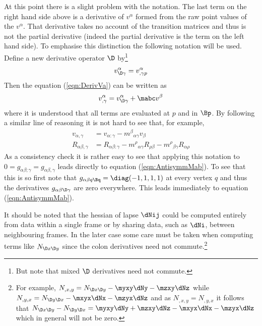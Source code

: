 \documentclass[a4paper,12pt]{article}
\numberwithin{equation}{section}
\begin{document}
At this point there is a slight problem with the notation. The last term on the right hand
side above is a derivative of $v^\alpha$ formed from the raw point values of the $v^\alpha$.
That derivative takes no account of the transition matrices and thus is not the partial
derivative (indeed the partial derivative is the term on the left hand side). To emphasise
this distinction the following notation will be used. Define a new derivative operator $\D$
by\footnote{But note that mixed $\D$ derivatives need not commute.}
\begin{align}
   v^\alpha_{\D\gamma}
   =
   v^\alpha_{,\gamma p}
\end{align}
Then the equation (\ref{eqn:DerivVa}) can be written as
\begin{align}
   v^\alpha_{,\gamma} = v^\alpha_{\D\gamma} + \mabc v^\beta
\end{align}
where it is understood that all terms are evaluated at $p$ and in $\Bp$.
By following a similar line of reasoning it is not hard to see that, for example,
\begin{align}
   v_{\alpha,\gamma} &= v_{\alpha:\gamma} - m^\beta{}_{\alpha\gamma} v_{\beta}\\
   R_{\alpha\beta,\gamma} &= R_{\alpha\beta:\gamma}
                           - m^\rho{}_{\alpha\gamma} R_{\rho\beta}
                           - m^\rho{}_{\beta\gamma} R_{\alpha\rho}
\end{align}
As a consistency check it is rather easy to see that applying this notation to
$0=g_{\alpha\beta;\gamma} = g_{\alpha\beta,\gamma}$ leads directly to equation
(\ref{eqn:AntisymmMab}). To see that this is so first note that $g_{\alpha\beta q\Bq} =
\diag(-1,1,1,1)$ at every vertex $q$ and thus the derivatives $g_{\alpha\beta\D\gamma}$ are
zero everywhere. This leads immediately to equation (\ref{eqn:AntisymmMab}).

It should be noted that the hessian of lapse $\dNij$ could be computed entirely from data
within a single frame or by sharing data, such as $\dNi$, between neighbouring frames. In
the later case some care must be taken when computing terms like $N_{\D x\D y}$ since the colon
derivatives need not commute.\footnote{For example, $N_{,x,y} =
N_{\D x\D y}-\myxy\dNy-\mzxy\dNz$ while $N_{,y,x} = N_{\D y\D x}-\mxyx\dNx-\mzyx\dNz$ and as
$N_{,x,y}=N_{,y,x}$ it follows that $N_{\D x\D y}-N_{\D y\D x} =
\myxy\dNy+\mzxy\dNz-\mxyx\dNx-\mzyx\dNz$ which in general will not be zero.}

\end{document}

